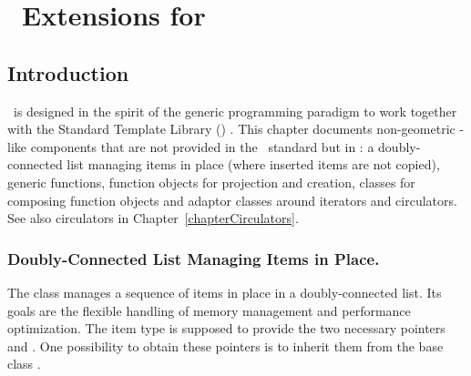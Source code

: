 
\chapter{\stl\ Extensions for \cgal}
\label{chapterDataStructures}\label{chapterStlExtensions}



\section*{Introduction}

\cgal\ is designed in the spirit of the generic programming paradigm
to work together with the Standard Template Library (\stl)
\cite{ansi-is14882,a-gps-98}. This chapter documents non-geometric
\stl-like components that are not provided in the \stl\ standard but
in \cgal: a doubly-connected list managing items in place (where
inserted items are not copied), generic functions, function objects
for projection and creation, classes for composing function objects
and adaptor classes around iterators and circulators. See also
circulators in Chapter~\ref{chapterCirculators}.

\subsection*{Doubly-Connected List Managing Items in Place.}

The class  manages a
sequence of items in place in a doubly-connected list. Its goals are
the flexible handling of memory management and performance
optimization. The item type is supposed to provide the two necessary
pointers  and . One possibility
to obtain these pointers is to inherit them from the base class
.

